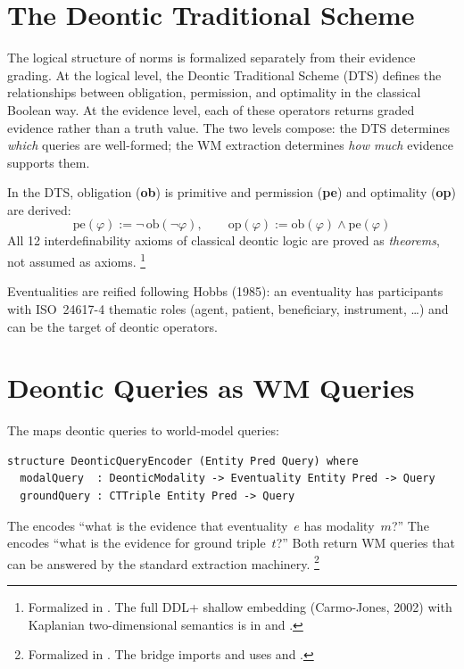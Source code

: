 \documentclass[11pt,openany]{report}
\begin{document}
\section{The Deontic Traditional Scheme}

The logical structure of norms is formalized separately from their
evidence grading.  At the logical level, the Deontic Traditional
Scheme (DTS) defines the relationships between obligation,
permission, and optimality in the classical Boolean way.  At the
evidence level, each of these operators returns graded evidence
rather than a truth value.  The two levels compose: the DTS
determines \emph{which} queries are well-formed; the WM extraction
determines \emph{how much} evidence supports them.

In the DTS, obligation (\textbf{ob}) is primitive and permission
(\textbf{pe}) and optimality (\textbf{op}) are derived:
\[
  \mathrm{pe}(\varphi) := \neg\,\mathrm{ob}(\neg\varphi),
  \qquad
  \mathrm{op}(\varphi) := \mathrm{ob}(\varphi) \wedge
  \mathrm{pe}(\varphi)
\]
All 12 interdefinability axioms of classical deontic logic are
proved as \emph{theorems}, not assumed as axioms.%
\footnote{Formalized in
.  The
full DDL+ shallow embedding (Carmo-Jones, 2002) with Kaplanian
two-dimensional semantics is in
 and
.}

Eventualities are reified following Hobbs (1985): an eventuality has
participants with ISO~24617-4 thematic roles (agent, patient,
beneficiary, instrument, \ldots) and can be the target of deontic
operators.


\section{Deontic Queries as WM Queries}

The  maps deontic queries to world-model
queries:

\begin{lstlisting}[language={}]
structure DeonticQueryEncoder (Entity Pred Query) where
  modalQuery  : DeonticModality -> Eventuality Entity Pred -> Query
  groundQuery : CTTriple Entity Pred -> Query
\end{lstlisting}

\noindent
The  encodes ``what is the evidence that
eventuality~$e$ has modality~$m$?''  The  encodes
``what is the evidence for ground triple~$t$?''  Both return WM
queries that can be answered by the standard extraction machinery.%
\footnote{Formalized in
.
The bridge imports  and uses
 and .}
\end{document}
